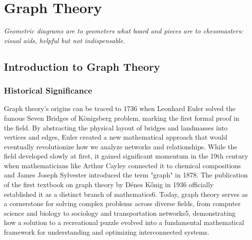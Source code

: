 \chapter{Graph Theory}

\epigraph{\textit{Geometric diagrams are to geometers what board and pieces are to chessmasters: visual aids, helpful but not indispensable.}}{}

\minitoc
\newpage
\section{Introduction to Graph Theory}
\subsection*{Historical Significance}
Graph theory's origins can be traced to 1736 when Leonhard Euler solved the famous Seven Bridges of K\"{o}nigsberg problem, marking the first formal proof in the field. By abstracting the physical layout of bridges and landmasses into vertices and edges, Euler created a new mathematical approach that would eventually revolutionize how we analyze networks and relationships. While the field developed slowly at first, it gained significant momentum in the 19th century when mathematicians like Arthur Cayley connected it to chemical compositions and James Joseph Sylvester introduced the term "graph" in 1878. The publication of the first textbook on graph theory by D\'enes K\H{o}nig in 1936 officially established it as a distinct branch of mathematics6. Today, graph theory serves as a cornerstone for solving complex problems across diverse fields, from computer science and biology to sociology and transportation networks5, demonstrating how a solution to a recreational puzzle evolved into a fundamental mathematical framework for understanding and optimizing interconnected systems.
 
